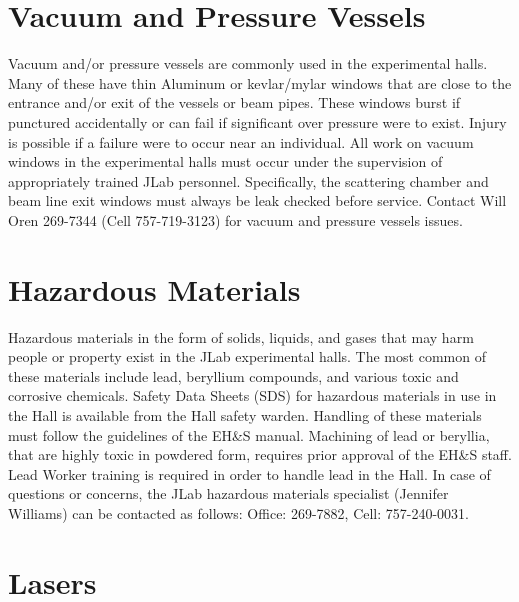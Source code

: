 \section{Vacuum and Pressure Vessels}

	Vacuum and/or pressure vessels are commonly used in the experimental halls. Many 
of these have thin Aluminum or kevlar/mylar windows that are close to the entrance 
and/or exit of the vessels or beam pipes. These windows burst if punctured accidentally 
or can fail if significant over pressure were to exist. Injury is possible if a failure 
were to occur near an individual. All work on vacuum windows in the experimental halls 
must occur under the supervision of appropriately trained JLab personnel. Specifically, 
the scattering chamber and beam line exit windows must always be leak checked before service. 
Contact Will Oren 269-7344 (Cell 757-719-3123) for vacuum and pressure vessels issues.

\section{Hazardous Materials}

	Hazardous materials in the form of solids, liquids, and gases that may harm people 
or property exist in the JLab experimental halls. The most common of these materials include 
lead, beryllium compounds, and various toxic and corrosive chemicals. 
Safety Data Sheets (SDS) for hazardous materials 
in use in the Hall is available from the Hall safety warden.  
Handling of these materials 
must follow the guidelines of the EH\&S manual. Machining of lead or beryllia, that 
are highly toxic in powdered form, requires prior approval of the EH\&S staff. 
Lead Worker training is required in order to handle lead in the Hall. 
In case of questions or concerns, the JLab hazardous materials specialist (Jennifer Williams) 
can be contacted as follows: Office: 269-7882, Cell: 757-240-0031.

\section{Lasers}


